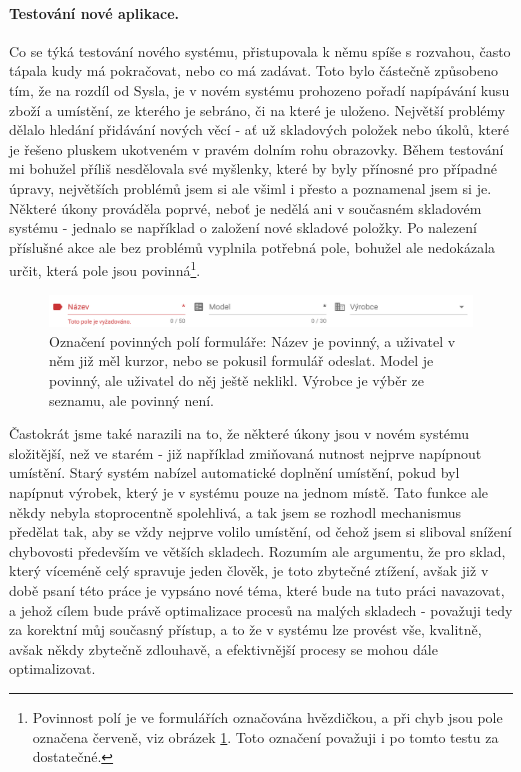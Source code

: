 \paragraph{Testování nové aplikace.} Co se týká testování nového systému, přistupovala k němu spíše s rozvahou, často tápala kudy má pokračovat, nebo co má zadávat. Toto bylo částečně způsobeno tím, že na rozdíl od Sysla, je v novém systému prohozeno pořadí napípávání kusu zboží a umístění, ze kterého je sebráno, či na které je uloženo. Největší problémy dělalo hledání přidávání nových věcí - ať už skladových položek nebo úkolů, které je řešeno pluskem ukotveném v pravém dolním rohu obrazovky. Během testování mi bohužel příliš nesdělovala své myšlenky, které by byly přínosné pro případné úpravy, největších problémů jsem si ale všiml i přesto a poznamenal jsem si je.\\
Některé úkony prováděla poprvé, neboť je nedělá ani v současném skladovém systému - jednalo se například o založení nové skladové položky. Po nalezení příslušné akce ale bez problémů vyplnila potřebná pole, bohužel ale nedokázala určit, která pole jsou povinná\footnote{Povinnost polí je ve formulářích označována hvězdičkou, a při chyb jsou pole označena červeně, viz obrázek \ref{picture:test:required_fields}. Toto označení považuji i po tomto testu za dostatečné.}.\\

\begin{figure}[h]
\includegraphics[width=\textwidth]{../png/app_testing/required_fields.png}
\caption[Označení povinných polí formuláře]{Označení povinných polí formuláře: Název je povinný, a uživatel v něm již měl kurzor, nebo se pokusil formulář odeslat. Model je povinný, ale uživatel do něj ještě neklikl. Výrobce je výběr ze seznamu, ale povinný není.} \label{picture:test:required_fields}
\end{figure}

Častokrát jsme také narazili na to, že některé úkony jsou v novém systému složitější, než ve starém - již například zmiňovaná nutnost nejprve napípnout umístění. Starý systém nabízel automatické doplnění umístění, pokud byl napípnut výrobek, který je v systému pouze na jednom místě. Tato funkce ale někdy nebyla stoprocentně spolehlivá, a tak jsem se rozhodl mechanismus předělat tak, aby se vždy nejprve volilo umístění, od čehož jsem si sliboval snížení chybovosti především ve větších skladech. Rozumím ale argumentu, že pro sklad, který víceméně celý spravuje jeden člověk, je toto zbytečné ztížení, avšak již v době psaní této práce je vypsáno nové téma, které bude na tuto práci navazovat, a jehož cílem bude právě optimalizace procesů na malých skladech - považuji tedy za korektní můj současný přístup, a to že v systému lze provést vše, kvalitně, avšak někdy zbytečně zdlouhavě, a efektivnější procesy se mohou dále optimalizovat.

